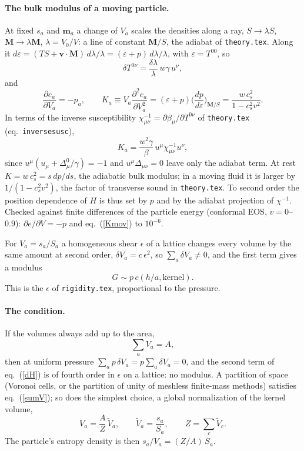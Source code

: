 \documentclass[11pt,aps,preprint,nofootinbib,superscriptaddress,tightenlines]{revtex4-2}
\def\st{\begin{equation}}
\def\stp{\end{equation}}
\def\Eq#1{eq.~(\ref{#1})}
\let\oldparagraph\paragraph
\renewcommand{\paragraph}{\par\bigskip\oldparagraph}
\begin{document}
\paragraph{The bulk modulus of a moving particle.}  At fixed $s_a$ and $\bm m_a$ a change of
$V_a$ scales the densities along a ray, $S\to\lambda S$, $\bm M\to\lambda\bm M$,
$\lambda=V_0/V$: a line of constant $\bm M/S$, the adiabat of \texttt{theory.tex}.  Along
it $d\varepsilon=(TS+\bm v\cdot\bm M)\,d\lambda/\lambda=(\varepsilon+p)\,d\lambda/\lambda$,
with $\varepsilon=T^{00}$, so
\st
\delta T^{0\nu}=\frac{\delta\lambda}{\lambda}\,w\gamma\,u^\nu ,
\stp
and
\st
\frac{\partial e_a}{\partial V_a}=-p_a,\qquad
K_a\equiv V_a\frac{\partial^2e_a}{\partial V_a^2}
=(\varepsilon+p)\Big(\frac{dp}{d\varepsilon}\Big)_{\bm M/S}
=\frac{w\,c_s^2}{1-c_s^2v^2} .
\label{Kmov}
\stp
In terms of the inverse susceptibility $\chi^{-1}_{\mu\nu}=\partial\beta_\mu/\partial T^{0\nu}$
of \texttt{theory.tex} (eq.~\texttt{inversesusc}),
\st
K_a=\frac{w^2\gamma}{\beta}\,u^\mu\chi^{-1}_{\mu\nu}u^\nu ,
\stp
since $u^\mu(u_\mu+\Delta^0_\mu/\gamma)=-1$ and $u^\mu\Delta_{\mu\nu}=0$ leave only the
adiabat term.  At rest $K=w\,c_s^2=s\,dp/ds$, the adiabatic bulk modulus; in a moving fluid
it is larger by $1/(1-c_s^2v^2)$, the factor of transverse sound in \texttt{theory.tex}.
To second order the position dependence of $H$ is thus set by $p$ and by the adiabat
projection of $\chi^{-1}$.  Checked against finite differences of the particle energy (conformal
EOS, $v=0$--$0.9$): $\partial e/\partial V=-p$ and \Eq{Kmov} to $10^{-6}$.

For $V_a=s_a/S_a$ a homogeneous shear $\epsilon$ of a
lattice changes every volume by the same amount at second order, $\delta V_a=c\,\epsilon^2$,
so $\sum_a\delta V_a\neq0$, and the first term gives a modulus
\st
G\sim p\,c(h/a,\text{kernel}).
\stp
This is the $\epsilon$ of \texttt{rigidity.tex}, proportional to the pressure.

\paragraph{The condition.}  If the volumes always add up to the area,
\st
\sum_aV_a=A ,
\label{sumV}
\stp
then at uniform pressure $\sum_ap\,\delta V_a=p\sum_a\delta V_a=0$, and the second term of
\Eq{dH} is of fourth order in $\epsilon$ on a lattice: no modulus.  A partition of space
(Voronoi cells, or the partition of unity of meshless finite-mass methods) satisfies
\Eq{sumV}; so does the simplest choice, a global normalization of the kernel volume,
\st
V_a=\frac{A}{Z}\,\tilde V_a,\qquad \tilde V_a=\frac{s_a}{S_a},\qquad Z=\sum_c\tilde V_c .
\label{Vnorm}
\stp
The particle's entropy density is then $s_a/V_a=(Z/A)\,S_a$.
\end{document}
